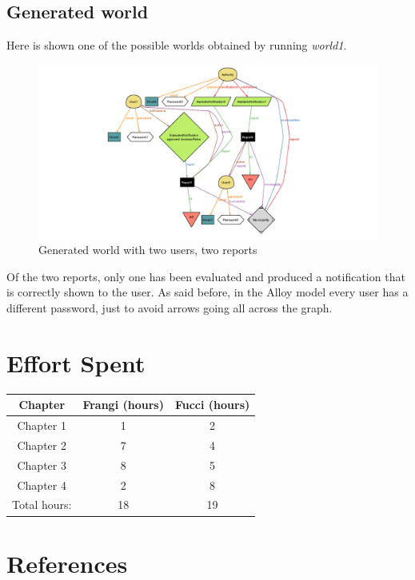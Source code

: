 \documentclass[12pt,a4paper]{report}
\begin{document}
	\newpage

	\section{Generated world}
	Here is shown one of the possible worlds obtained by running \emph{world1}.


		\begin{figure}[H]
				\includegraphics[scale = 1.4, center]{world1}				
				\caption{Generated world with two users, two reports}
		\end{figure}

	Of the two reports, only one has been evaluated and produced a notification that is correctly shown to the user. As said before, in the Alloy model every user has a different password, just to avoid arrows going all across the graph. 

\chapter{Effort Spent}
	\begin{table}[H]
		\centering
		\begin{tabular}{|c|c|c|}
			\hline
			Chapter & Frangi (hours) & Fucci (hours)\\
			\hline
			\hline
			Chapter 1 & 1 & 2\\
			\hline
			Chapter 2 & 7 & 4\\
			\hline
			Chapter 3 & 8 & 5\\
			\hline
			Chapter 4 & 2 & 8\\
			\hline
			Total hours: & 18 & 19\\
			\hline
		\end{tabular}
		\label{tab: }
	\end{table}

\chapter{References}
\end{document}
